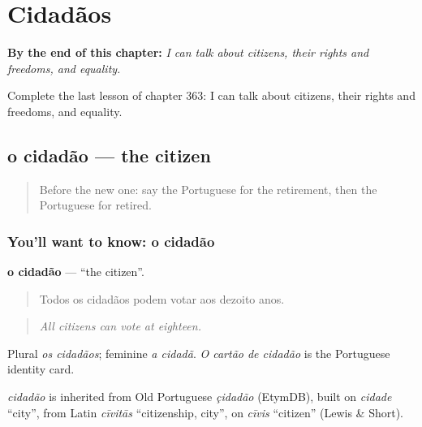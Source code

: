 
\chapter{Cidadãos}
\label{ch:pt-cidadaos}

\begin{chapteropening}
\textbf{By the end of this chapter:} \emph{I can talk about citizens, their rights and freedoms, and equality.}

Complete the last lesson of chapter 363: I can talk about citizens, their rights and freedoms, and equality.
\end{chapteropening}

\section[o cidadão]{o cidadão — the citizen}

\label{lesson:PT-C363-cidadao}



\begin{quote}
Before the new one: say the Portuguese for the retirement, then the Portuguese for retired.
\end{quote}

\subsection*{You'll want to know: o cidadão}
\textbf{o cidadão} — \textquotedblleft{}the citizen\textquotedblright{}.

\begin{quote}
Todos os cidadãos podem votar aos dezoito anos.
\end{quote}

\begin{quote}
\emph{All citizens can vote at eighteen.}
\end{quote}

Plural \emph{os cidadãos}; feminine \emph{a cidadã}. \emph{O cartão de cidadão} is the Portuguese identity card.

\begin{cousinweb}
\emph{cidadão} is inherited from Old Portuguese \emph{çidadão} (EtymDB), built on \emph{cidade} \textquotedblleft{}city\textquotedblright{}, from Latin \emph{cīvitās} \textquotedblleft{}citizenship, city\textquotedblright{}, on \emph{cīvis} \textquotedblleft{}citizen\textquotedblright{} (Lewis \& Short).
\end{cousinweb}

